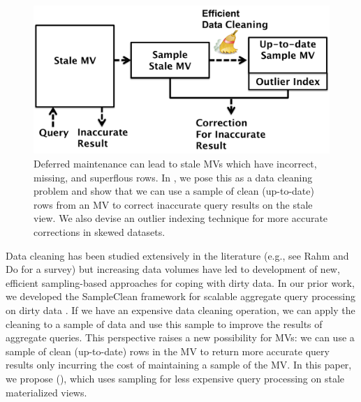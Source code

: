 \begin{figure}[t] \vspace{-2em}
\centering
 \includegraphics[scale=0.25]{figs/sys-arch.pdf} \vspace{-.25em}
 \caption{Deferred maintenance can lead to stale MVs which have incorrect, missing, and superflous rows. In \svc, we pose this as a data cleaning problem and show that we can use a sample of clean (up-to-date) rows from an MV to correct inaccurate query results on the stale view. We also devise an outlier indexing technique for more accurate corrections in skewed datasets. \label{sys-arch}}\vspace{-1.75em}
\end{figure}

Data cleaning has been studied extensively in the literature (e.g., see Rahm and Do for a survey\cite{rahm2000data}) but increasing data volumes have led to development of new, efficient sampling-based approaches for coping with dirty data.   
In our prior work, we developed the SampleClean framework for scalable aggregate query processing on dirty data \cite{wang1999sample}.
If we have an expensive data cleaning operation, we can apply the cleaning to a sample of data and use this sample to improve the results of aggregate queries.
This perspective raises a new possibility for MVs: we can use a sample of clean (up-to-date) rows in the MV to return more accurate query results only incurring the cost of maintaining a sample of the MV.
In this paper, we propose \svcfull (\svc), which uses sampling for less expensive query processing on stale materialized views.


